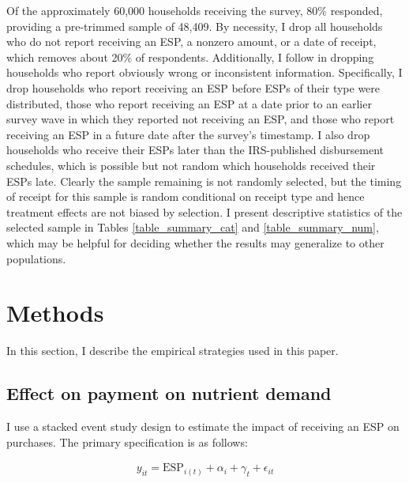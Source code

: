 \documentclass[12pt]{article}
\begin{document}
Of the approximately 60,000 households receiving the survey, 80\% responded, providing a pre-trimmed sample of 48,409.
By necessity, I drop all households who do not report receiving an ESP, a nonzero amount, or a date of receipt, which removes about 20\% of respondents.
Additionally, I follow \textcite{broda2014economic} in dropping households who report obviously wrong or inconsistent information.
Specifically, I drop households who report receiving an ESP before ESPs of their type were distributed, those who report receiving an ESP at a date prior to an earlier survey wave in which they reported not receiving an ESP, and those who report receiving an ESP in a future date after the survey's timestamp.
I also drop households who receive their ESPs later than the IRS-published disbursement schedules, which is possible but not random which households received their ESPs late.
Clearly the sample remaining is not randomly selected, but the timing of receipt for this sample is random conditional on receipt type and hence treatment effects are not biased by selection.
I present descriptive statistics of the selected sample in Tables \ref{table_summary_cat} and \ref{table_summary_num}, which may be helpful for deciding whether the results may generalize to other populations.


\section{Methods} \label{methods}

In this section, I describe the empirical strategies used in this paper.

\subsection{Effect on payment on nutrient demand}

I use a stacked event study design to estimate the impact of receiving an ESP on purchases.
The primary specification is as follows:

\begin{align}
	y_{it} = \text{ESP}_{i(t)} + \alpha_i + \gamma_t + \epsilon_{it} \label{spec_es}
\end{align}
\end{document}
